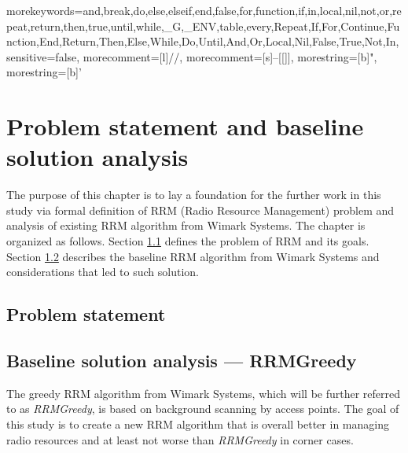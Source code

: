 

{
morekeywords={and,break,do,else,elseif,end,false,for,function,if,in,local,nil,not,or,repeat,return,then,true,until,while,_G,_ENV,table,every,Repeat,If,For,Continue,Function,End,Return,Then,Else,While,Do,Until,And,Or,Local,Nil,False,True,Not,In},
sensitive=false,
morecomment=[l]{//},
morecomment=[s]{--[[}{]]},
morestring=[b]",
morestring=[b]'
}

\lstset{style=mystyle}

\chapter{Problem statement and baseline solution analysis}
\label{chap:met}


The purpose of this chapter is to lay a foundation for the further work in this study via formal definition of RRM (Radio Resource Management) problem and analysis of existing RRM algorithm from Wimark Systems. The chapter is organized as follows. Section \ref{sec:prob} defines the problem of RRM and its goals. Section \ref{sec:baseline} describes the baseline RRM algorithm from Wimark Systems and considerations that led to such solution.


\section{Problem statement}
\label{sec:prob}


\section{Baseline solution analysis --- RRMGreedy}
\label{sec:baseline}
The greedy RRM algorithm from Wimark Systems, which will be further referred to as \textit{RRMGreedy}, is based on background scanning by access points. The goal of this study is to create a new RRM algorithm that is overall better in managing radio resources and at least not worse than \textit{RRMGreedy} in corner cases.

